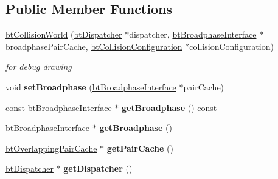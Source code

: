 \subsection*{Public Member Functions}
\begin{DoxyCompactItemize}
\item 
\hypertarget{classbt_collision_world_a6d2c3ec40c17296308c2b229ae3962ea}{\hyperlink{classbt_collision_world_a6d2c3ec40c17296308c2b229ae3962ea}{bt\+Collision\+World} (\hyperlink{classbt_dispatcher}{bt\+Dispatcher} $\ast$dispatcher, \hyperlink{classbt_broadphase_interface}{bt\+Broadphase\+Interface} $\ast$broadphase\+Pair\+Cache, \hyperlink{classbt_collision_configuration}{bt\+Collision\+Configuration} $\ast$collision\+Configuration)}\label{classbt_collision_world_a6d2c3ec40c17296308c2b229ae3962ea}

\begin{DoxyCompactList}\small\item\em for debug drawing \end{DoxyCompactList}\item 
\hypertarget{classbt_collision_world_ad55a4c7bd8fb64e4caf6c58e62795bfb}{void {\bfseries set\+Broadphase} (\hyperlink{classbt_broadphase_interface}{bt\+Broadphase\+Interface} $\ast$pair\+Cache)}\label{classbt_collision_world_ad55a4c7bd8fb64e4caf6c58e62795bfb}

\item 
\hypertarget{classbt_collision_world_ac3d03338a16bc21bea6c9f08770179d1}{const \hyperlink{classbt_broadphase_interface}{bt\+Broadphase\+Interface} $\ast$ {\bfseries get\+Broadphase} () const }\label{classbt_collision_world_ac3d03338a16bc21bea6c9f08770179d1}

\item 
\hypertarget{classbt_collision_world_a6138b6b1a4496a6857f1dfa71f6841e5}{\hyperlink{classbt_broadphase_interface}{bt\+Broadphase\+Interface} $\ast$ {\bfseries get\+Broadphase} ()}\label{classbt_collision_world_a6138b6b1a4496a6857f1dfa71f6841e5}

\item 
\hypertarget{classbt_collision_world_a7327cc034ead04b732bd242f21b690cf}{\hyperlink{classbt_overlapping_pair_cache}{bt\+Overlapping\+Pair\+Cache} $\ast$ {\bfseries get\+Pair\+Cache} ()}\label{classbt_collision_world_a7327cc034ead04b732bd242f21b690cf}

\item 
\hypertarget{classbt_collision_world_a65b5cb3b0070b3aca14cb4c2aff25ed5}{\hyperlink{classbt_dispatcher}{bt\+Dispatcher} $\ast$ {\bfseries get\+Dispatcher} ()}\label{classbt_collision_world_a65b5cb3b0070b3aca14cb4c2aff25ed5}


\end{DoxyCompactItemize}
